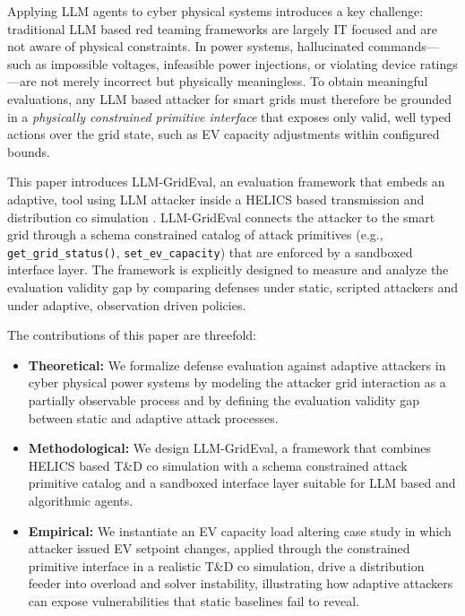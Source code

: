 Applying LLM agents to cyber physical systems introduces a key challenge: traditional LLM based red teaming frameworks are largely IT focused and are not aware of physical constraints. In power systems, hallucinated commands---such as impossible voltages, infeasible power injections, or violating device ratings---are not merely incorrect but physically meaningless. To obtain meaningful evaluations, any LLM based attacker for smart grids must therefore be grounded in a \emph{physically constrained primitive interface} that exposes only valid, well typed actions over the grid state, such as EV capacity adjustments within configured bounds.

This paper introduces LLM-GridEval, an evaluation framework that embeds an adaptive, tool using LLM attacker inside a HELICS based transmission and distribution co simulation \cite{hardy2024helics}. LLM-GridEval connects the attacker to the smart grid through a schema constrained catalog of attack primitives (e.g., \texttt{get\_grid\_status()}, \texttt{set\_ev\_capacity}) that are enforced by a sandboxed interface layer. The framework is explicitly designed to measure and analyze the evaluation validity gap by comparing defenses under static, scripted attackers and under adaptive, observation driven policies.

The contributions of this paper are threefold:
\begin{itemize}
	\item \textbf{Theoretical:} We formalize defense evaluation against adaptive attackers in cyber physical power systems by modeling the attacker grid interaction as a partially observable process and by defining the evaluation validity gap between static and adaptive attack processes.
	\item \textbf{Methodological:} We design LLM-GridEval, a framework that combines HELICS based T\&D co simulation with a schema constrained attack primitive catalog and a sandboxed interface layer suitable for LLM based and algorithmic agents.
	\item \textbf{Empirical:} We instantiate an EV capacity load altering case study in which attacker issued EV setpoint changes, applied through the constrained primitive interface in a realistic T\&D co simulation, drive a distribution feeder into overload and solver instability, illustrating how adaptive attackers can expose vulnerabilities that static baselines fail to reveal.
\end{itemize}

